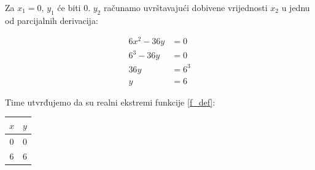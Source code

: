 Za $x_1 = 0$, $y_1$ će biti $0$. $y_2$ računamo uvrštavajući dobivene vrijednosti $x_2$ u jednu od parcijalnih derivacija:

\begin{align*}
    6x^2 - 36y &= 0\\
    6^3 - 36y &= 0\\
    36y &= 6^3\\
    y &= 6
\end{align*}

Time utvrđujemo da su realni ekstremi funkcije \eqref{f_def}:

\begin{center}
\begin{tabular}{c | c}
    $x$ & $y$ \\
    \hline
    $0$ & $0$ \\
    $6$ & $6$ \\
\end{tabular}
\end{center}

\newpage